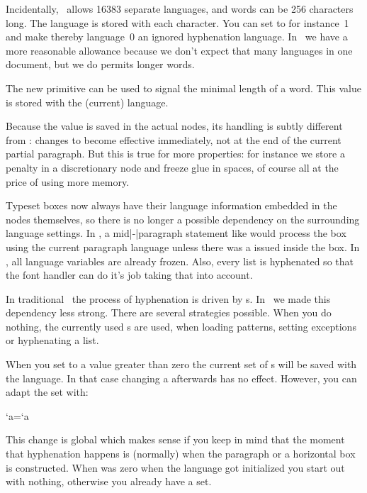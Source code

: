 Incidentally, \LUATEX\ allows 16383 separate languages, and words can be 256
characters long. The language is stored with each character. You can set
\type {\firstvalidlanguage} to for instance~1 and make thereby language~0
an ignored hyphenation language. In \LUAMETATEX\ we have a more reasonable
allowance because we don't expect that many languages in one document, but we do
permits longer words.

The new primitive \type {\hyphenationmin} can be used to signal the minimal length
of a word. This value is stored with the (current) language.

Because the \type {\uchyph} value is saved in the actual nodes, its handling is
subtly different from : changes to \type {\uchyph} become effective
immediately, not at the end of the current partial paragraph. But this is true
for more properties: for instance we store a penalty in a discretionary node and
freeze glue in spaces, of course all at the price of using more memory.

Typeset boxes now always have their language information embedded in the nodes
themselves, so there is no longer a possible dependency on the surrounding
language settings. In , a mid|-|paragraph statement like 
would process the box using the current paragraph language unless there was a
\type {\setlanguage} issued inside the box. In \LUATEX, all language variables
are already frozen. Also, every list is hyphenated so that the font handler can
do it's job taking that into account.

In traditional \TEX\ the process of hyphenation is driven by \type {\lccode}s. In
\LUATEX\ we made this dependency less strong. There are several strategies
possible. When you do nothing, the currently used \type {\lccode}s are used, when
loading patterns, setting exceptions or hyphenating a list.

When you set \type {\savinghyphcodes} to a value greater than zero the current set
of \type {\lccode}s will be saved with the language. In that case changing a \type
{\lccode} afterwards has no effect. However, you can adapt the set with:

\starttyping
\hjcode`a=`a
\stoptyping

This change is global which makes sense if you keep in mind that the moment that
hyphenation happens is (normally) when the paragraph or a horizontal box is
constructed. When \type {\savinghyphcodes} was zero when the language got
initialized you start out with nothing, otherwise you already have a set.

